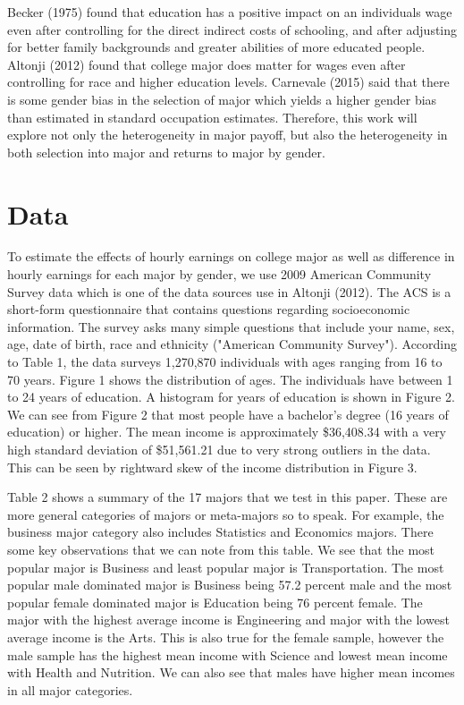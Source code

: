 \documentclass[12pt]{article}
\begin{document}
\par Becker (1975) found that education has a positive impact on an individuals wage even after controlling for the direct indirect costs of schooling, and after adjusting for better family backgrounds and greater abilities of more educated people. Altonji (2012) found that college major does matter for wages even after controlling for race and higher education levels. Carnevale (2015) said that there is some gender bias in the selection of major which yields a higher gender bias than estimated in standard occupation estimates. Therefore, this work will explore not only the heterogeneity in major payoff, but also the heterogeneity in both selection into major and returns to major by gender.

\section{Data}
\par To estimate the effects of hourly earnings on college major as well as difference in hourly earnings for each major by gender, we use 2009 American Community Survey data which is one of the data sources use in Altonji (2012). The ACS is a short-form questionnaire that contains questions regarding socioeconomic information. The survey asks many simple questions that include your name, sex, age, date of birth, race and ethnicity ("American Community Survey"). According to Table 1, the data surveys 1,270,870 individuals with ages ranging from 16 to 70 years. Figure 1 shows the distribution of ages. The individuals have between 1 to 24 years of education. A histogram for years of education is shown in Figure 2. We can see from Figure 2 that most people have a bachelor's degree (16 years of education) or higher. The mean income is approximately \$36,408.34 with a very high standard deviation of \$51,561.21 due to very strong outliers in the data. This can be seen by rightward skew of the income distribution in Figure 3.  

\par Table 2 shows a summary of the 17 majors that we test in this paper. These are more general categories of majors or meta-majors so to speak. For example, the business major category also includes Statistics and Economics majors. There some key observations that we can note from this table. We see that the most popular major is Business and least popular major is Transportation. The most popular male dominated major is Business being 57.2 percent male and the most popular female dominated major is Education being 76 percent female. The major with the highest average income is Engineering and major with the lowest average income is the Arts. This is also true for the female sample, however the male sample has the highest mean income with Science and lowest mean income with Health and Nutrition. We can also see that males have higher mean incomes in all major categories.
\end{document}
